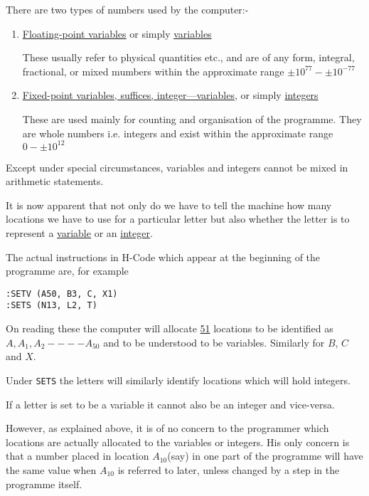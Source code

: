 \documentclass[10pt, a4paper, oneside]{article}
\newcommand{\myuline}[1]{\uline{#1}}
\newcommand{\mytt}[1]{\texttt{\footnotesize #1}}
\begin{document}
\begin{multicols}{2}
There are two types of numbers used by the
computer:-

\renewcommand{\labelenumi}{(\alph{enumi})}
\begin{enumerate}

\item \myuline{Floating-point variables} or simply \myuline{variables}

These usually refer to physical quantities
etc., and are of any form, integral, fractional, or
mixed mumbers within the approximate range $\pm 10^{77} - \pm 10^{-77}$

\item \myuline{Fixed-point variables, suffices, integer—variables},
or simply \myuline{integers}

These are used mainly for counting and
organisation of the programme.  They are whole numbers
i.e. integers and exist within the approximate range
$0 - \pm 10^{12}$
\end{enumerate}

Except under special circumstances, variables
and integers cannot be mixed in arithmetic statements.

It is now apparent that not only do we have to
tell the machine how many locations we have to use for
a particular letter but also whether the letter is to
represent a \myuline{variable} or an \myuline{integer}.

The actual instructions in H-Code which appear
at the beginning of the programme are, for example

\begin{addmargin}[1cm]{1em}%
\begin{lstlisting}
:SETV (A50, B3, C, X1)
:SETS (N13, L2, T)
\end{lstlisting}
\end{addmargin}

On reading these the computer will allocate \myuline{51}
locations to be identified as $A, A_{1}, A_{2} - - - - A_{50}$
and to be understood to be variables.  Similarly for
$B$, $C$ and $X$.

Under \mytt{SETS} the letters will similarly identify
locations which will hold integers.

If a letter is set to be a variable it cannot
also be an integer and vice-versa.

However, as explained above, it is of no
concern to the programmer which locations are actually
allocated to the variables or integers.  His only
concern is that a number placed in location $A_{10}$(say) in
one part of the programme will have the same value when
$A_{10}$ is referred to later, unless changed by a step in
the programme itself.


\end{multicols}
\end{document}
